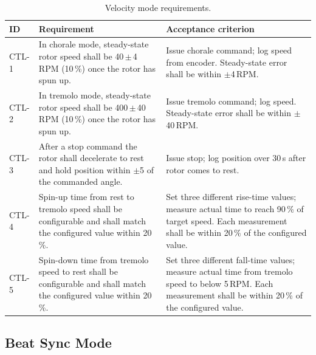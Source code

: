 \begin{table}[H]
	\centering
	\begin{tabular}{p{1.2cm} p{5.5cm} p{6cm}}
		\toprule
		\textbf{ID} & \textbf{Requirement}                                                                                                     & \textbf{Acceptance criterion} \\
		\midrule
		CTL-1       & In chorale mode, steady-state rotor speed shall be 40\,$\pm$\,4\,RPM (10\,\%) once the rotor has spun up.                &
		Issue chorale command; log speed from encoder. Steady-state error shall be within $\pm$4\,RPM.                                                                         \\[4pt]
		CTL-2       & In tremolo mode, steady-state rotor speed shall be 400\,$\pm$\,40\,RPM (10\,\%) once the rotor has spun up.              &
		Issue tremolo command; log speed. Steady-state error shall be within $\pm$40\,RPM.                                                                                     \\[4pt]
		CTL-3       & After a stop command the rotor shall decelerate to rest and hold position within $\pm$5\degree{} of the commanded angle. &
		Issue stop; log position over 30\,s after rotor comes to rest.                                                                                                         \\[4pt]
		CTL-4       & Spin-up time from rest to tremolo speed shall be configurable and shall match the configured value within 20\,\%.        &
		Set three different rise-time values; measure actual time to reach 90\,\% of target speed. Each measurement shall be within 20\,\% of the configured value.            \\[4pt]
		CTL-5       & Spin-down time from tremolo speed to rest shall be configurable and shall match the configured value within 20\,\%.      &
		Set three different fall-time values; measure actual time from tremolo speed to below 5\,RPM. Each measurement shall be within 20\,\% of the configured value.         \\
		\bottomrule
	\end{tabular}
	\caption{Velocity mode requirements.}
	\label{tab:spec-velocity}
\end{table}

\subsection{Beat Sync Mode}

